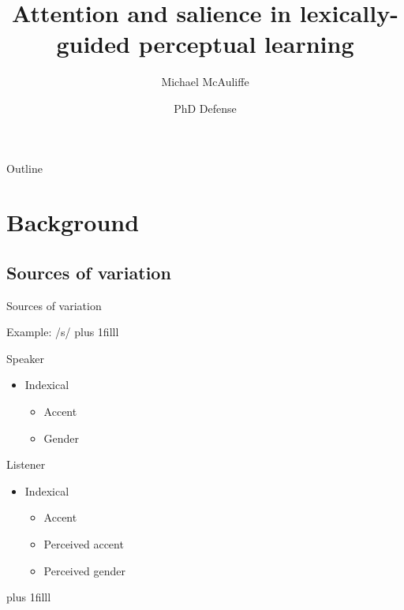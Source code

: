 \documentclass{beamer}
\title
{Attention and salience in lexically-guided perceptual learning}
\author
{Michael McAuliffe}
\institute
{}
\date
{PhD Defense}
\newcommand{\btVFill}{\vskip0pt plus 1filll}
\begin{document}
\begin{frame}
  \titlepage
\end{frame}

\begin{frame}{Outline}
\tableofcontents
\end{frame}

\section{Background}

\subsection{Sources of variation}

\begin{frame}{Sources of variation}

Example: /s/
\btVFill
\begin{minipage}[t]{0.45\textwidth}
Speaker

\begin{itemize}
\item Indexical
\begin{itemize}
\item Accent
\item Gender
\end{itemize}

\end{itemize}
\end{minipage}
\hfill
\begin{minipage}[t]{0.45\textwidth}
Listener

\begin{itemize}
\item Indexical
\begin{itemize}
\item Accent
\item Perceived accent
\item Perceived gender
\end{itemize}
\end{itemize}
\end{minipage}
\btVFill
\begin{flushright}
\scriptsize
\citet{Strand1996, Li2011, Kraljic2005}
\end{flushright}
\end{frame}
\end{document}
